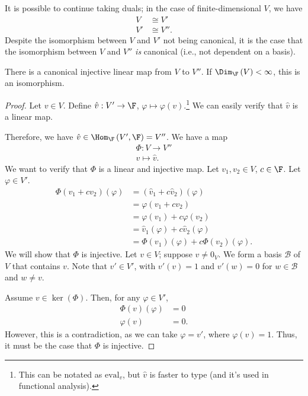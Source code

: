 \documentclass[10pt]{mypackage}
\begin{document}
\begin{remark}
  It is possible to continue taking duals; in the case of finite-dimensional $V$, we have
  \begin{align*}
    V &\cong V'\\
    V' &\cong V''.
  \end{align*}
  Despite the isomorphism between $V$ and $V'$ not being canonical, it is the case that the isomorphism between $V$ and $V''$ \textit{is} canonical (i.e., not dependent on a basis).
\end{remark}
\begin{proposition}
  There is a canonical injective linear map from $V$ to $V''$. If $\Dim_{\F}\left(V\right) < \infty$, this is an isomorphism.
\end{proposition}
\begin{proof}
  Let $v\in V$. Define $\hat{v}: V' \rightarrow \F$, $\varphi \mapsto \varphi(v)$.\footnote{This can be notated as $\text{eval}_v$, but $\hat{v}$ is faster to type (and it's used in functional analysis).} We can easily verify that $\hat{v}$ is a linear map.\newline

  Therefore, we have $\hat{v}\in \Hom_{\F}\left(V',\F\right) = V''$. We have a map
  \begin{align*}
    \Phi: V\rightarrow V''\\
    v\mapsto \hat{v}.
  \end{align*}
  We want to verify that $\Phi$ is a linear and injective map. Let $v_1,v_2\in V$, $c\in \F$. Let $\varphi\in V'$.
  \begin{align*}
    \Phi\left(v_1 + cv_2\right)\left(\varphi\right) &= \left(\hat{v}_1 + c\hat{v}_2\right)\left(\varphi\right)\\
                                                    &= \varphi\left(v_1 + cv_2\right)\\
                                                    &= \varphi\left(v_1\right) + c\varphi\left(v_2\right)\\
                                                    &= \hat{v}_1\left(\varphi\right) + c\hat{v}_2\left(\varphi\right)\\
                                                    &= \Phi\left(v_1\right)(\varphi) + c\Phi\left(v_2\right)\left(\varphi\right).
  \end{align*}
  We will show that $\Phi$ is injective. Let $v\in V$; suppose $v\neq 0_V$. We form a basis $\mathcal{B}$ of $V$ that contains $v$. Note that $v'\in V'$, with $v'(v) = 1$ and $v'(w) = 0$ for $w\in \mathcal{B}$ and $w\neq v$.\newline
  
  Assume $v\in \ker\left(\Phi\right)$. Then, for any $\varphi\in V'$,
  \begin{align*}
    \Phi\left(v\right)(\varphi) &= 0\\
    \varphi(v) &= 0.
  \end{align*}
  However, this is a contradiction, as we can take $\varphi = v'$, where $\varphi(v) = 1$. Thus, it must be the case that $\Phi$ is injective.
\end{proof}
\end{document}
